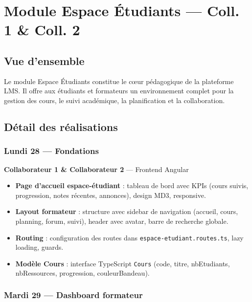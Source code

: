 \documentclass[a4paper,12pt,french]{article}
\begin{document}
\newpage

\section{Module Espace Étudiants — Coll. 1 \& Coll. 2}

\subsection{Vue d'ensemble}

Le module Espace Étudiants constitue le cœur pédagogique de la plateforme LMS. Il offre aux étudiants et formateurs un environnement complet pour la gestion des cours, le suivi académique, la planification et la collaboration.

\subsection{Détail des réalisations}

\subsubsection{Lundi 28 — Fondations}

\begin{assignmentbox}
\textbf{Collaborateur 1 \& Collaborateur 2} — Frontend Angular
\end{assignmentbox}

\begin{itemize}
    \item \textbf{Page d'accueil espace-étudiant} : tableau de bord avec KPIs (cours suivis, progression, notes récentes, annonces), design MD3, responsive.
    \item \textbf{Layout formateur} : structure avec sidebar de navigation (accueil, cours, planning, forum, suivi), header avec avatar, barre de recherche globale.
    \item \textbf{Routing} : configuration des routes dans \texttt{espace-etudiant.routes.ts}, lazy loading, guards.
    \item \textbf{Modèle Cours} : interface TypeScript \texttt{Cours} (code, titre, nbEtudiants, nbRessources, progression, couleurBandeau).
\end{itemize}

\subsubsection{Mardi 29 — Dashboard formateur}
\end{document}
